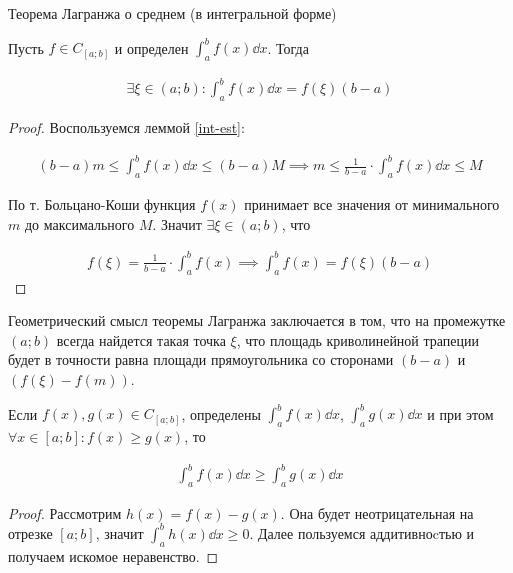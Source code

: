 \begin{theorem}\label{L-mid-int}
  Теорема Лагранжа о среднем (в интегральной форме)

  Пусть \(f \in C_{[a;b]}\) и определен \(\int_{a}^{b} f(x) \dd x\). Тогда

  \begin{align*}
    \exists \xi \in (a; b) \colon \int_{a}^{b} f(x) \dd x = f(\xi) (b - a)
  \end{align*}
\end{theorem}
\begin{proof}
  Воспользуемся леммой \ref{int-est}:

  \begin{align*}
    (b - a) m \le \int_{a}^{b} f(x) \dd x \le (b - a) M
    \implies m \le \frac{1}{b - a} \cdot \int_{a}^{b} f(x) \dd x \le M
  \end{align*}

  По т. Больцано-Коши функция \(f(x)\) принимает все значения от минимального
  \(m\) до максимального \(M\). Значит \(\exists \xi \in (a; b)\), что

  \begin{align*}
    f(\xi) = \frac{1}{b - a} \cdot \int_{a}^{b} f(x)
    \implies \int_{a}^{b} f(x) = f(\xi) (b - a)
  \end{align*}
\end{proof}

\begin{remark}
  Геометрический смысл теоремы Лагранжа заключается в том, что на промежутке
  \((a; b)\) всегда найдется такая точка \(\xi\), что площадь криволинейной
  трапеции будет в точности равна площади прямоугольника со сторонами
  \((b - a)\) и \((f(\xi) - f(m))\).
\end{remark}

\begin{lemma}
  Если \(f(x), g(x) \in C_{[a; b]}\), определены
  \(\int_{a}^{b} f(x) \dd x\), \(\int_{a}^{b} g(x) \dd x\)
  и при этом
  \(\forall x \in [a; b] \colon f(x) \ge g(x)\), то

  \begin{align*}
    \int_{a}^{b} f(x) \dd x \ge \int_{a}^{b} g(x) \dd x
  \end{align*}
\end{lemma}
\begin{proof}
  Рассмотрим \(h(x) = f(x) - g(x)\). Она будет неотрицательная на отрезке
  \([a; b]\), значит \(\int_{a}^{b} h(x) \dd x \ge 0\). Далее пользуемся
  аддитивноcтью и получаем искомое неравенство.
\end{proof}

